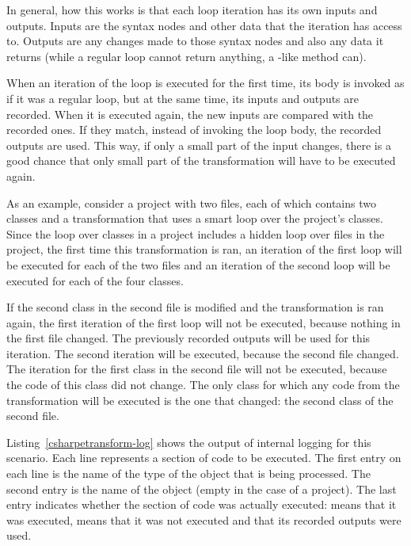 \medskip

In general, how this works is that each loop iteration has its own inputs and outputs. Inputs are the syntax nodes and other data that the iteration has access to. Outputs are any changes made to those syntax nodes and also any data it returns (while a regular  loop cannot return anything, a -like method can).

When an iteration of the loop is executed for the first time, its body is invoked as if it was a regular  loop, but at the same time, its inputs and outputs are recorded. When it is executed again, the new inputs are compared with the recorded ones. If they match, instead of invoking the loop body, the recorded outputs are used. This way, if only a small part of the input changes, there is a good chance that only small part of the transformation will have to be executed again.

\medskip

As an example, consider a project with two files, each of which contains two classes and a transformation that uses a smart  loop over the project's classes. Since the loop over classes in a project includes a hidden loop over files in the project, the first time this transformation is ran, an iteration of the first loop will be executed for each of the two files and an iteration of the second loop will be executed for each of the four classes.

If the second class in the second file is modified and the transformation is ran again, the first iteration of the first loop will not be executed, because nothing in the first file changed. The previously recorded outputs will be used for this iteration. The second iteration will be executed, because the second file changed. The iteration for the first class in the second file will not be executed, because the code of this class did not change. The only class for which any code from the transformation will be executed is the one that changed: the second class of the second file.

Listing~\ref{csharpetransform-log} shows the output of internal logging for this scenario. Each line represents a section of code to be executed. The first entry on each line is the name of the type of the object that is being processed. The second entry is the name of the object (empty in the case of a project). The last entry indicates whether the section of code was actually executed:  means that it was executed,  means that it was not executed and that its recorded outputs were used.

